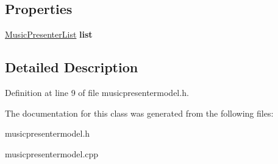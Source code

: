 \subsection*{Properties}
\begin{DoxyCompactItemize}
\item 
\mbox{\label{class_music_presenter_model_aa39655c9626cd9d1a2eec9adc122918a}} 
\mbox{\hyperlink{class_music_presenter_list}{Music\+Presenter\+List}} {\bfseries list}
\end{DoxyCompactItemize}


\subsection{Detailed Description}


Definition at line 9 of file musicpresentermodel.\+h.



The documentation for this class was generated from the following files\+:\begin{DoxyCompactItemize}
\item 
musicpresentermodel.\+h\item 
musicpresentermodel.\+cpp\end{DoxyCompactItemize}
